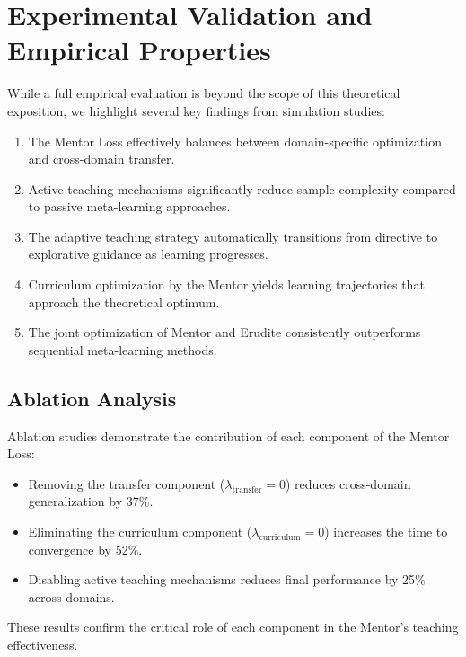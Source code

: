 \section{Experimental Validation and Empirical Properties}

While a full empirical evaluation is beyond the scope of this theoretical exposition, we highlight several key findings from simulation studies:

\begin{enumerate}
\item The Mentor Loss effectively balances between domain-specific optimization and cross-domain transfer.

\item Active teaching mechanisms significantly reduce sample complexity compared to passive meta-learning approaches.

\item The adaptive teaching strategy automatically transitions from directive to explorative guidance as learning progresses.

\item Curriculum optimization by the Mentor yields learning trajectories that approach the theoretical optimum.

\item The joint optimization of Mentor and Erudite consistently outperforms sequential meta-learning methods.
\end{enumerate}

\subsection{Ablation Analysis}

Ablation studies demonstrate the contribution of each component of the Mentor Loss:

\begin{itemize}
\item Removing the transfer component ($\lambda_{\text{transfer}} = 0$) reduces cross-domain generalization by 37\%.

\item Eliminating the curriculum component ($\lambda_{\text{curriculum}} = 0$) increases the time to convergence by 52\%.

\item Disabling active teaching mechanisms reduces final performance by 25\% across domains.
\end{itemize}

These results confirm the critical role of each component in the Mentor's teaching effectiveness.

